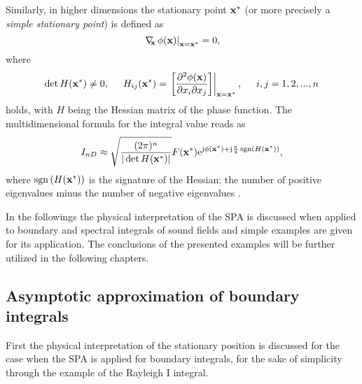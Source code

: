 Similarly, in higher dimensions the stationary point $\mathbf{x}^*$ (or more precisely a \emph{simple stationary point}) is defined as
\begin{equation}
\label{Eq:ndim_stat_point}
\left.
\nabla_{\!\!\mathbf{x}}\, \phi(\mathbf{x})\right|_{\mathbf{x} = \mathbf{x}^*} = 0,
\end{equation}
where 
\begin{equation}
\det H(\mathbf{x}^*) \neq 0,
\hspace{5mm} 
H_{ij}(\mathbf{x}^*) = \left. \left[
\frac{\partial^2 \phi(\mathbf{x})}{\partial x_i \partial x_j} 
\right] \right|_{\mathbf{x} = \mathbf{x}^*},
\hspace{5mm}
i,j = 1,2,...,n
\end{equation}
holds, with $H$ being the Hessian matrix of the phase function.
The multidimensional formula for the integral value reads as
\begin{equation}
\label{Eq:SPAResult_nd}
I_{nD} \approx \sqrt{\frac{(2\pi)^n}{|\det H(\mathbf{x}^*)|}} F(\mathbf{x}^*) \mathrm{e}^{\mathrm{j} \phi(\mathbf{x}^*) + \mathrm{j} \frac{\pi}{4}\,\mathrm{sgn}\left( H(\mathbf{x}^*) \right)},
\end{equation}
where $\mathrm{sgn}\left( H(\mathbf{x}^*) \right)$ is the signature of the Hessian: the number of positive eigenvalues minus the number of negative eigenvalues \cite{Bleistein2000}.

In the followings the physical interpretation of the SPA is discussed when applied to boundary and spectral integrals of sound fields and simple examples are given for its application.
The conclusions of the presented examples will be further utilized in the following chapters.

\subsection{Asymptotic approximation of boundary integrals}
\label{Sec:HS_approx:SPA_for_Rayleigh}
First the physical interpretation of the stationary position is discussed for the case when the SPA is applied for boundary integrals, for the sake of simplicity through the example of the Rayleigh I integral.
%

